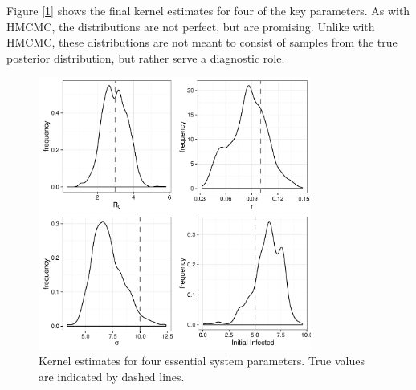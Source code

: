 	Figure [\ref{if2kernelplot}] shows the final kernel estimates for four of the key parameters. As with HMCMC, the distributions are not perfect, but are promising. Unlike with HMCMC, these distributions are not meant to consist of samples from the true posterior distribution, but rather serve a diagnostic role.

    \begin{figure}
        \centering
        \captionsetup{width=0.8\linewidth}
        \includegraphics[width=0.8\textwidth]{./images/if2kernels.pdf}
        \caption{Kernel estimates for four essential system parameters. True values are indicated by dashed lines. \label{if2kernelplot}}
    \end{figure}
